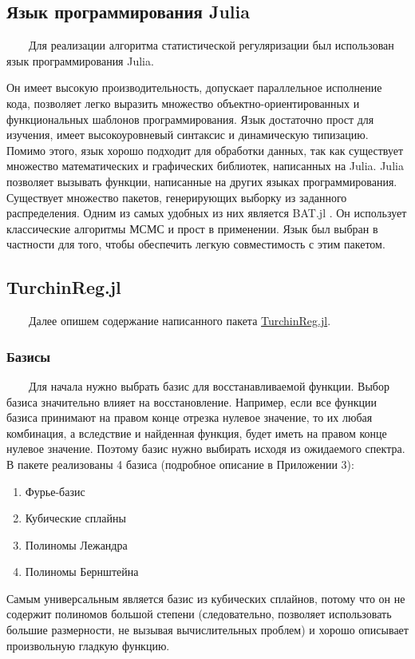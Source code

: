 \documentclass{config}
\begin{document}
\subsection{Язык программирования Julia}
~~~~Для реализации алгоритма статистической регуляризации был использован язык программирования Julia.

Он имеет высокую производительность, допускает параллельное исполнение кода, позволяет легко выразить множество объектно-ориентированных и функциональных шаблонов программирования. Язык достаточно прост для изучения,  имеет высокоуровневый синтаксис и динамическую типизацию. Помимо этого, язык хорошо подходит для обработки данных, так как существует множество математических и графических библиотек, написанных на Julia. Julia позволяет вызывать функции, написанные на других языках программирования. Существует множество пакетов, генерирующих выборку из заданного распределения. Одним из самых удобных из них является BAT.jl \cite{bat}. Он использует классические алгоритмы МСМС и прост в применении. Язык был выбран в частности для того, чтобы обеспечить легкую совместимость с этим пакетом.


\subsection{TurchinReg.jl}
~~~~Далее опишем содержание написанного пакета \href{https://github.com/mipt-npm/TurchinReg.jl}{TurchinReg.jl}.

\subsubsection{Базисы}
~~~~Для начала нужно выбрать базис для восстанавливаемой функции. Выбор базиса значительно влияет на восстановление. Например, если все функции базиса принимают на правом конце отрезка нулевое значение, то их любая комбинация, а вследствие и найденная функция, будет иметь на правом конце нулевое значение. Поэтому базис нужно выбирать исходя из ожидаемого спектра. В пакете реализованы 4 базиса (подробное описание в Приложении 3):
\begin{enumerate}
    \item Фурье-базис
    \item Кубические сплайны
    \item Полиномы Лежандра
    \item Полиномы Бернштейна
\end{enumerate}

Самым универсальным является базис из кубических сплайнов, потому что он не содержит полиномов большой степени (следовательно, позволяет использовать большие размерности, не вызывая вычислительных проблем) и хорошо описывает произвольную гладкую функцию.
\end{document}
